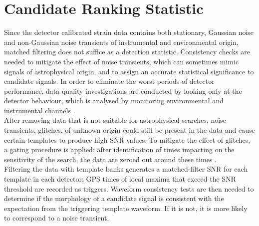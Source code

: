 \documentclass[binding=0.6cm, LaM]{sapthesis}
\begin{document}
\section{Candidate Ranking Statistic}

 	Since the detector calibrated strain data contains both stationary, Gaussian noise
        and non-Gaussian noise transients of instrumental and environmental origin,
        matched filtering does not suffice as a detection statistic.
        Consistency checks are needed to mitigate the effect of noise transients,
        which can sometimes mimic signals of astrophysical origin,
        and to assign an accurate statistical significance to candidate signals.
        In order to eliminate the worst periods of detector performance, 
        data quality investigations are conducted by looking only at the detector behaviour,  
        which is analysed by monitoring environmental and instrumental channels \cite{40}.\\
        After removing data that is not suitable for astrophysical searches, 
        noise transients, glitches, of unknown origin could still be present in the data 
        and cause certain templates to produce high SNR values.
        To mitigate the effect of glitches, a gating procedure is applied:
        after identification of times impacting on the sensitivity of the search,
        the data are zeroed out around these times \cite{42}. \\
        Filtering the data with template banks generates a matched-filter SNR for each template in each detector;
        GPS times of local maxima that exceed the SNR threshold are recorded as triggers. 
        Waveform consistency tests are then needed to determine if the morphology 
        of a candidate signal is consistent with the expectation from the triggering template waveform.  If it is not,
        it is more likely to correspond to a noise transient.
	
\end{document}
